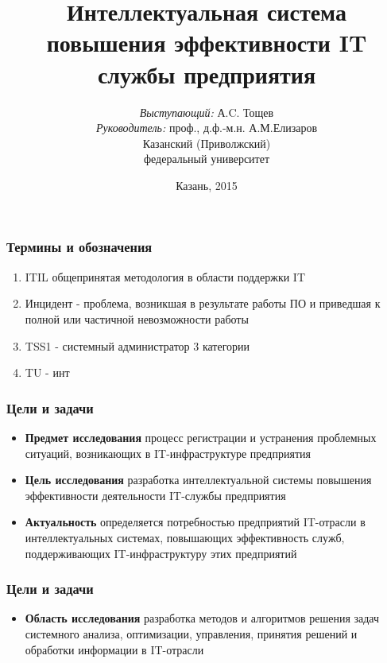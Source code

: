 \documentclass[14pt]{beamer}
\title{\small{Интеллектуальная система повышения эффективности IT службы предприятия}}
\author{\small{%
\emph{Выступающий:} А.C. Тощев\\%
\emph{Руководитель:} проф., д.ф.-м.н. А.М.Елизаров}\\%
\vspace{30pt}%
Казанский (Приволжский)\\
федеральный университет%
\vspace{20pt}%
}
\date{\small{Казань, 2015}}
\begin{document}
\maketitle

\begin{frame}
\frametitle{Термины и обозначения}
\begin{enumerate}
    \item ITIL общепринятая методология в области поддержки IT
    \item Инцидент - проблема, возникшая в результате работы ПО и приведшая к полной или частичной невозможности работы
    \item TSS1 - системный администратор 3 категории
    \item TU - инт
  
\end{enumerate}
\end{frame}

\begin{frame}
\frametitle{Цели и задачи}
\begin{itemize}
  \item \textbf{Предмет исследования} процесс регистрации и устранения проблемных ситуаций, возникающих в IT-инфраструктуре предприятия 
  \item \textbf{Цель исследования}  разработка интеллектуальной системы повышения эффективности деятельности IT-службы предприятия
  \item \textbf{Актуальность} определяется потребностью предприятий IT-отрасли в интеллектуальных системах, повышающих эффективность служб, поддерживающих IT-инфраструктуру этих предприятий
\end{itemize}
\end{frame}

\begin{frame}
\frametitle{Цели и задачи}
\begin{itemize}
    \item \textbf{Область исследования} разработка методов и алгоритмов решения задач системного анализа, оптимизации, управления, принятия решений и обработки информации в IT-отрасли %
\end{itemize}
\end{frame}
\end{document}
